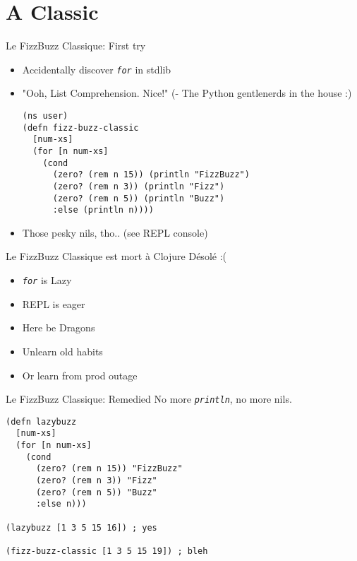 \documentclass[presentation]{beamer}
\begin{document}
\section{A Classic}
\label{sec:org1f2beca}
\begin{frame}[label={sec:orgaeb2465},fragile]{Le FizzBuzz Classique: First try}
 \begin{itemize}
\item Accidentally discover \emph{\texttt{for}} in stdlib
\item "Ooh, List Comprehension. Nice!"
(- The Python gentlenerds in the house :)
\pause
\begin{verbatim}
(ns user)
(defn fizz-buzz-classic
  [num-xs]
  (for [n num-xs]
    (cond
      (zero? (rem n 15)) (println "FizzBuzz")
      (zero? (rem n 3)) (println "Fizz")
      (zero? (rem n 5)) (println "Buzz")
      :else (println n))))
\end{verbatim}
\pause
\item Those pesky nils, tho.. (see REPL console)
\end{itemize}
\end{frame}
\begin{frame}[label={sec:org401141f},fragile]{Le FizzBuzz Classique est mort à Clojure}
 Désolé :(

\begin{itemize}
\item \emph{\texttt{for}} is Lazy

\item REPL is eager

\item Here be Dragons

\item Unlearn old habits

\item Or learn from prod outage
\end{itemize}
\end{frame}
\begin{frame}[label={sec:orgd4a6253},fragile]{Le FizzBuzz Classique: Remedied}
 No more \emph{\texttt{println}}, no more nils.
\begin{verbatim}
(defn lazybuzz
  [num-xs]
  (for [n num-xs]
    (cond
      (zero? (rem n 15)) "FizzBuzz"
      (zero? (rem n 3)) "Fizz"
      (zero? (rem n 5)) "Buzz"
      :else n)))

(lazybuzz [1 3 5 15 16]) ; yes

(fizz-buzz-classic [1 3 5 15 19]) ; bleh
\end{verbatim}
\end{frame}
\end{document}
